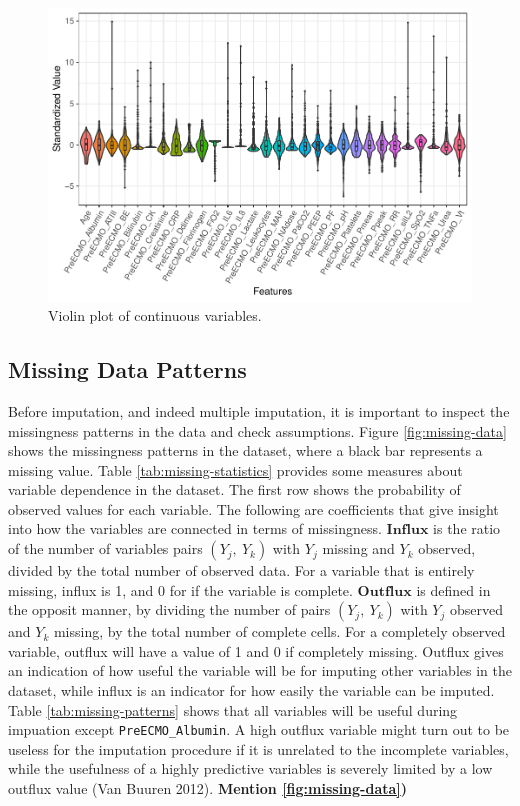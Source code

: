 \documentclass[12pt,]{article}
\begin{document}
\begin{figure}[H]

{\centering \includegraphics[width=1\linewidth]{figure/graphics-violinplot-raw-1} 

}

\caption{\label{fig:violin}Violin plot of continuous variables.}\label{fig:violinplot-raw}
\end{figure}

\subsection{Missing Data Patterns}\label{missing-data-patterns}

Before imputation, and indeed multiple imputation, it is important to
inspect the missingness patterns in the data and check assumptions.
Figure \ref{fig:missing-data} shows the missingness patterns in the
dataset, where a black bar represents a missing value. Table
\ref{tab:missing-statistics} provides some measures about variable
dependence in the dataset. The first row shows the probability of
observed values for each variable. The following are coefficients that
give insight into how the variables are connected in terms of
missingness. \(\mathbf{Influx}\) is the ratio of the number of variables
pairs \((Y_j, ~Y_k)\) with \(Y_j\) missing and \(Y_k\) observed, divided
by the total number of observed data. For a variable that is entirely
missing, influx is 1, and 0 for if the variable is complete.
\(\mathbf{Outflux}\) is defined in the opposit manner, by dividing the
number of pairs \((Y_j, ~Y_k)\) with \(Y_j\) observed and \(Y_k\)
missing, by the total number of complete cells. For a completely
observed variable, outflux will have a value of 1 and 0 if completely
missing. Outflux gives an indication of how useful the variable will be
for imputing other variables in the dataset, while influx is an
indicator for how easily the variable can be imputed. Table
\ref{tab:missing-patterns} shows that all variables will be useful
during impuation except \texttt{PreECMO\_Albumin}. A high outflux
variable might turn out to be useless for the imputation procedure if it
is unrelated to the incomplete variables, while the usefulness of a
highly predictive variables is severely limited by a low outflux value
(Van Buuren 2012). \textbf{Mention \ref{fig:missing-data})}
\end{document}
